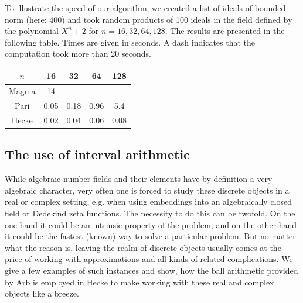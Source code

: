 \documentclass{sig-alternate-05-2015}
\begin{document}
To illustrate the speed of our algorithm, we created a list of ideals of bounded norm (here: 400) and
took random products of 100 ideals in the field
defined by the polynomial $X^n + 2$ for $n=16, 32, 64, 128$.
The results are presented in the following table.
Times are given in seconds. A dash indicates that the computation took  more than 20 seconds.
\begin{center}
\begin{tabular}{c||c|c|c|c}
$n$ & 16 & 32 & 64 & 128 \\\hline
Magma & 14 & -& - & -        \\
Pari & 0.05 & 0.18 & 0.96 & 5.4 \\
Hecke & 0.02 & 0.04 & 0.06 & 0.08
\end{tabular}
\end{center}


\subsection{The use of interval arithmetic}

While algebraic number fields and their elements have by definition a very algebraic character, very often one is forced to study these discrete objects in a real or complex setting, e.g. when using embeddings into an algebraically closed field or Dedekind zeta functions.
The necessity to do this can be twofold. On the one hand it could be an intrinsic property of the problem, and on the other hand it could be the fastest (known) way to solve a particular problem.
But no matter what the reason is, leaving the realm of discrete objects usually comes at the price of working with approximations and all kinds of related complications.
We give a few examples of such instances and show, how the ball arithmetic provided by Arb is employed in Hecke to make working with these real and complex objects like a breeze.
\end{document}

